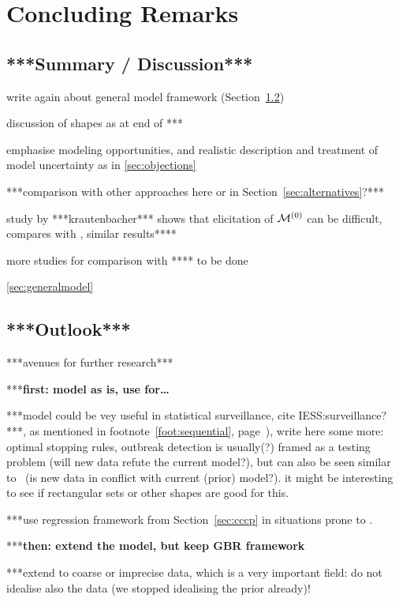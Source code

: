 \chapter{Concluding Remarks}
\label{cha:concluding}


\section{***Summary / Discussion***}

write again about general model framework (Section~\ref{})

discussion of shapes as at end of ***

emphasise modeling opportunities, and realistic description and treatment
of model uncertainty as in \ref{sec:objections}




***comparison with other approaches here or in Section~\ref{sec:alternatives}?***

study by ***krautenbacher*** shows that elicitation of $\mathcal{M}^{(0)}$ can be difficult,
compares with \textcite{2005:whitcomb}, similar results****

more studies for comparison with **** to be done


\ref{sec:generalmodel}





\section{***Outlook***}

***avenues for further research***

***\textbf{first: model as is, use for\dots }

***model could be vey useful in statistical surveillance, cite IESS:surveillance?***,
as mentioned in footnote~\ref{foot:sequential}, page~\pageref{foot:sequential}),
write here some more: optimal stopping rules, outbreak detection is usually(?)
framed as a testing problem (will new data refute the current model?),
but can also be seen similar to \pdc\ (is new data in conflict with current (prior) model?).
it might be interesting to see if rectangular sets or other shapes are good for this.  

***use regression framework from Section~\ref{sec:cccp} in situations prone to \pdc.


***\textbf{then: extend the model, but keep GBR framework}

***extend to coarse or imprecise data, which is a very important field:
do not idealise also the data (we stopped idealising the prior already)!

